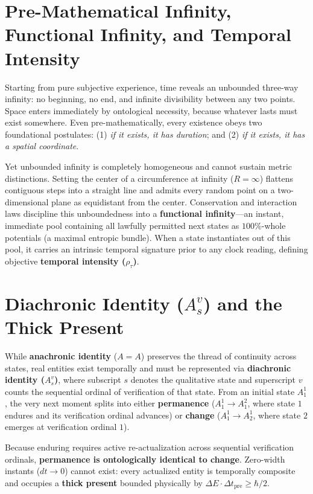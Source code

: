 \documentclass[11pt,a4paper]{article}
\begin{document}
\section{Pre-Mathematical Infinity, Functional Infinity, and Temporal Intensity}
Starting from pure subjective experience, time reveals an unbounded three-way infinity: no beginning, no end, and infinite divisibility between any two points. Space enters immediately by ontological necessity, because whatever lasts must exist somewhere. Even pre-mathematically, every existence obeys two foundational postulates: (1) \emph{if it exists, it has duration}; and (2) \emph{if it exists, it has a spatial coordinate}.

Yet unbounded infinity is completely homogeneous and cannot sustain metric distinctions. Setting the center of a circumference at infinity ($R = \infty$) flattens contiguous steps into a straight line and admits every random point on a two-dimensional plane as equidistant from the center. Conservation and interaction laws discipline this unboundedness into a \textbf{functional infinity}---an instant, immediate pool containing all lawfully permitted next states as $100\%$-whole potentials (a maximal entropic bundle). When a state instantiates out of this pool, it carries an intrinsic temporal signature prior to any clock reading, defining objective \textbf{temporal intensity ($\rho_\tau$)}.

\section{Diachronic Identity ($A_s^v$) and the Thick Present}
While \textbf{anachronic identity} ($A = A$) preserves the thread of continuity across states, real entities exist temporally and must be represented via \textbf{diachronic identity ($A_s^v$)}, where subscript $s$ denotes the qualitative state and superscript $v$ counts the sequential ordinal of verification of that state. From an initial state $A_1^1$, the very next moment splits into either \textbf{permanence} ($A_1^1 \to A_1^2$, where state $1$ endures and its verification ordinal advances) or \textbf{change} ($A_1^1 \to A_2^1$, where state $2$ emerges at verification ordinal $1$).

Because enduring requires active re-actualization across sequential verification ordinals, \textbf{permanence is ontologically identical to change}. Zero-width instants ($dt \to 0$) cannot exist: every actualized entity is temporally composite and occupies a \textbf{thick present} bounded physically by $\Delta E \cdot \Delta t_{\text{pre}} \ge \hbar/2$.
\end{document}
